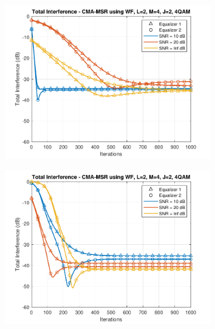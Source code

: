 \begin{figure}
\begin{subfigure}[b]{0.45\textwidth}
		\includegraphics[width=\linewidth]{./figs/BF_WF_MSR_TI_4QAM_L=2_M=4_J=2_K=200.pdf}
		\label{fig:wf_msr_ti200}
	\end{subfigure}
	\begin{subfigure}[b]{0.45\textwidth}
		\includegraphics[width=\linewidth]{./figs/BF_WF_MSR_TI_4QAM_L=2_M=4_J=2_K=1000.pdf}
		\label{fig:wf_msr_ti1000}
	\end{subfigure}
	\begin{subfigure}[b]{0.45\textwidth}

\end{subfigure}
\end{figure}
